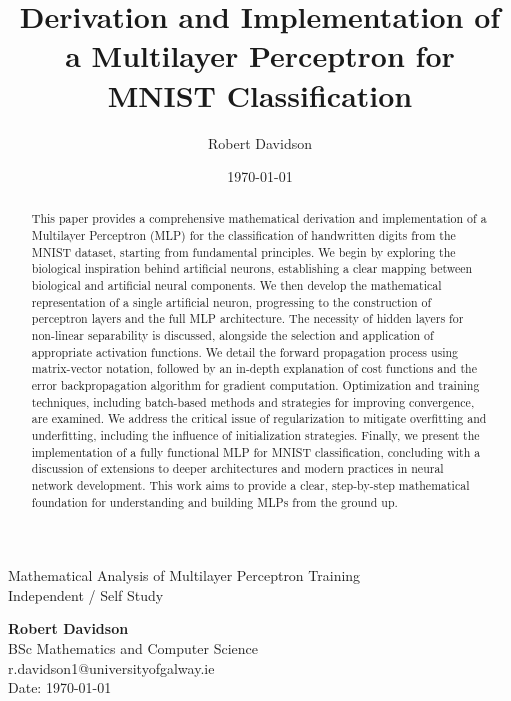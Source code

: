 \documentclass[9pt]{extarticle}
\title{Derivation and Implementation of a Multilayer Perceptron for MNIST Classification}
\author{Robert Davidson}
\date{\today}
\theoremstyle{plain}
\theoremstyle{definition}
\theoremstyle{remark}
\begin{document}
\begin{center}
    Mathematical Analysis of Multilayer Perceptron Training\\
    Independent / Self Study\\[24pt]
    \LARGE

    \Large
    \textbf{Robert Davidson}\\[6pt]
    \small
    BSc Mathematics and Computer Science \\ r.davidson1@universityofgalway.ie\\[6pt]
    Date: \today\\[12pt]
\end{center}
\begin{abstract}
    \begin{adjustwidth}{1cm}{1cm}
        This paper provides a comprehensive mathematical derivation and implementation of a Multilayer Perceptron (MLP)
        for the classification of handwritten digits from the MNIST dataset, starting from fundamental principles.
        We begin by exploring the biological inspiration behind artificial neurons, establishing a clear mapping between biological and artificial neural components.
        We then develop the mathematical representation of a single artificial neuron, progressing to the construction of perceptron layers and the full MLP architecture.
        The necessity of hidden layers for non-linear separability is discussed, alongside the selection and application of appropriate activation functions.
        We detail the forward propagation process using matrix-vector notation, followed by an in-depth explanation of cost functions and the error backpropagation algorithm
        for gradient computation. Optimization and training techniques, including batch-based methods and strategies for improving convergence, are examined.
        We address the critical issue of regularization to mitigate overfitting and underfitting, including the influence of initialization strategies.
        Finally, we present the implementation of a fully functional MLP for MNIST classification, concluding with a discussion of extensions to deeper architectures
        and modern practices in neural network development. This work aims to provide a clear, step-by-step mathematical foundation for understanding and building MLPs from the ground up.
    \end{adjustwidth}
\end{abstract}

\vspace{1.5cm}
\end{document}

